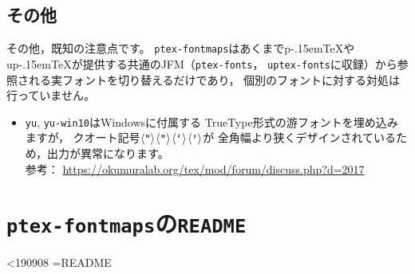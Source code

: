 \documentclass{jlreq}
\makeatletter
\def\loadprint#1{%
  \openin\xx@myread=#1\relax
  \@whilesw\unless\ifeof\xx@myread\fi{%
    \readline\xx@myread to \xx@dataline
    \expandafter\xx@striplf\xx@dataline\@nil
    \leavevmode\null\xx@dataline\par
  }%
  \closein\xx@myread
}
\def\file#1{\texttt{#1}}
\def\command#1{\texttt{#1}}
\def\codechar#1{\ensuremath{\langle\mbox{\texttt{#1}}\rangle}}
\def\pTeX{p\kern-.15em\TeX}
\def\upTeX{u\pTeX}
\makeatother
\begin{document}
\subsection{その他}

その他，既知の注意点です。
\file{ptex-fontmaps}はあくまで\pTeX や\upTeX が提供する共通のJFM（\file{ptex-fonts}，
\file{uptex-fonts}に収録）から参照される実フォントを切り替えるだけであり，
個別のフォントに対する対処は行っていません。

\begin{itemize}
  \item \command{yu}, \command{yu-win10}はWindowsに付属する
        TrueType形式の游フォントを埋め込みますが，
        クオート記号\codechar{“}\codechar{”}\codechar{‘}\codechar{’}が
        全角幅より狭くデザインされているため，出力が異常になります。\\
        参考： \url{https://okumuralab.org/tex/mod/forum/discuss.php?d=2017}
\end{itemize}





\clearpage
\appendix


\section{\file{ptex-fontmaps}の\file{README}}\label{ptex-fontmaps-readme}

\ifnum\epTeXversion<190908\relax
\else
  {\frenchspacing\ttfamily\footnotesize\loadprint{README}}
\fi
\end{document}
